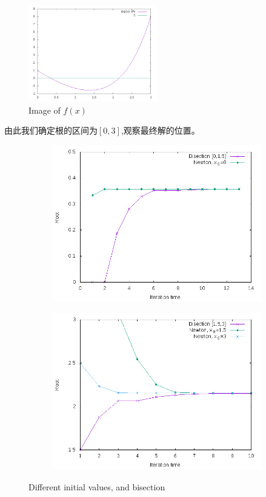 \documentclass{ctexart}
\begin{document}
\begin{figure}[H]
  \centering
  \includegraphics[width=0.5\textwidth]{f.png}
  \caption{Image of $f(x)$}
\end{figure}

由此我们确定根的区间为$[0,3]$,观察最终解的位置。
\begin{figure}[H]
  \begin{subfigure}{0.5\linewidth}
  \centering
  \includegraphics[width=1\textwidth]{graph4.png}
  \end{subfigure}
  \begin{subfigure}{0.5\linewidth}
  \centering
  \includegraphics[width=1\textwidth]{graph5.png}
  \end{subfigure}
  \caption{Different initial values, and bisection}
\end{figure}
\end{document}
